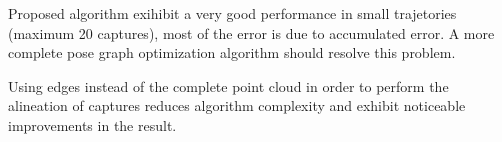 Proposed algorithm exihibit a very good performance in small trajetories (maximum 20 captures), 
most of the error is due to accumulated error. A more complete pose graph optimization algorithm 
should resolve this problem.

Using edges instead of the complete point cloud in order to perform the alineation of captures 
reduces algorithm complexity and exhibit noticeable improvements in the result. 


